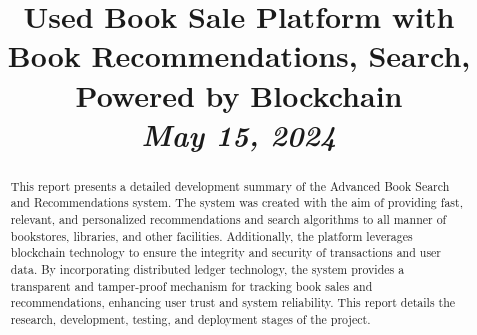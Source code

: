 \documentclass[12pt]{article}
\title{
    \vspace{2in}
    \textbf{Used Book Sale Platform with Book Recommendations, Search, Powered by Blockchain} \\
    \vspace{0.5in}
    \large \textit{May 15, 2024} \\
    \vspace{2in}
}
\author{}
\date{}
\begin{document}
\maketitle
\vfill

\begin{abstract}
    This report presents a detailed development summary of the Advanced Book Search and Recommendations system. The system was created with the aim of providing fast, relevant, and personalized recommendations and search algorithms to all manner of bookstores, libraries, and other facilities. Additionally, the platform leverages blockchain technology to ensure the integrity and security of transactions and user data. By incorporating distributed ledger technology, the system provides a transparent and tamper-proof mechanism for tracking book sales and recommendations, enhancing user trust and system reliability. This report details the research, development, testing, and deployment stages of the project.
\end{abstract}
\end{document}
